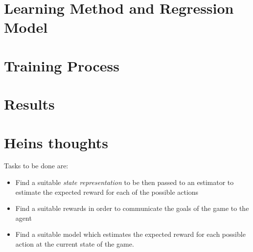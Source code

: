 \documentclass[12pt]{report}
\begin{document}

\tableofcontents
\pagebreak

\renewcommand{\thesection}{\arabic{section}}

\section{Learning Method and Regression Model}

	
\section{Training Process}


\section{Results}
\label{results}


\section{Heins thoughts}
Tasks to be done are:
	\begin{itemize}
		\item Find a suitable \textit{state representation} to be then passed to an estimator to estimate the expected reward for each of the possible actions
		\item Find a suitable rewards in order to communicate the goals of the game to the agent
		\item Find a suitable model which estimates the expected reward for each possible action at the current state of the game.
	\end{itemize}
\end{document}
